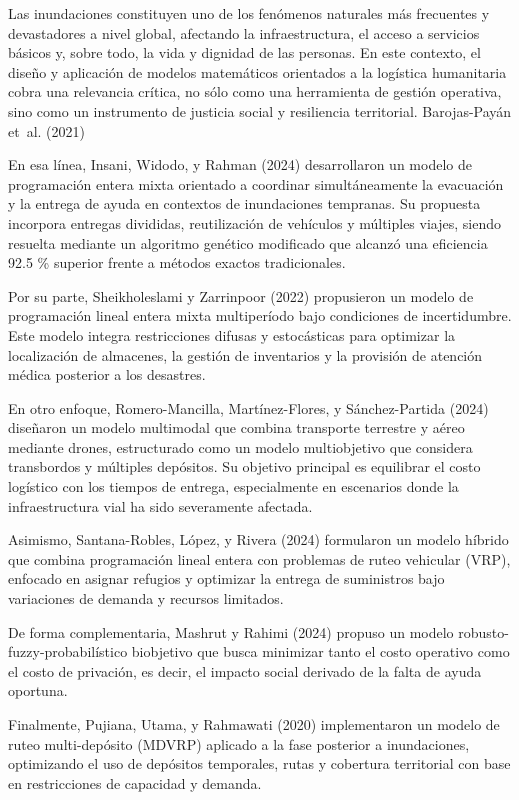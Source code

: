 \documentclass[
  spanish,
  us-letterpaper,
  DIV=11,
  numbers=noendperiod]{scrreprt}
\numberwithin{equation}{section}
\begin{document}
Las inundaciones constituyen uno de los fenómenos naturales más
frecuentes y devastadores a nivel global, afectando la infraestructura,
el acceso a servicios básicos y, sobre todo, la vida y dignidad de las
personas. En este contexto, el diseño y aplicación de modelos
matemáticos orientados a la logística humanitaria cobra una relevancia
crítica, no sólo como una herramienta de gestión operativa, sino como un
instrumento de justicia social y resiliencia territorial. Barojas-Payán
et~al. (2021)

En esa línea, Insani, Widodo, y Rahman (2024) desarrollaron un modelo de
programación entera mixta orientado a coordinar simultáneamente la
evacuación y la entrega de ayuda en contextos de inundaciones tempranas.
Su propuesta incorpora entregas divididas, reutilización de vehículos y
múltiples viajes, siendo resuelta mediante un algoritmo genético
modificado que alcanzó una eficiencia 92.5 \% superior frente a métodos
exactos tradicionales.

Por su parte, Sheikholeslami y Zarrinpoor (2022) propusieron un modelo
de programación lineal entera mixta multiperíodo bajo condiciones de
incertidumbre. Este modelo integra restricciones difusas y estocásticas
para optimizar la localización de almacenes, la gestión de inventarios y
la provisión de atención médica posterior a los desastres.

En otro enfoque, Romero-Mancilla, Martínez-Flores, y Sánchez-Partida
(2024) diseñaron un modelo multimodal que combina transporte terrestre y
aéreo mediante drones, estructurado como un modelo multiobjetivo que
considera transbordos y múltiples depósitos. Su objetivo principal es
equilibrar el costo logístico con los tiempos de entrega, especialmente
en escenarios donde la infraestructura vial ha sido severamente
afectada.

Asimismo, Santana-Robles, López, y Rivera (2024) formularon un modelo
híbrido que combina programación lineal entera con problemas de ruteo
vehicular (VRP), enfocado en asignar refugios y optimizar la entrega de
suministros bajo variaciones de demanda y recursos limitados.

De forma complementaria, Mashrut y Rahimi (2024) propuso un modelo
robusto-fuzzy-probabilístico biobjetivo que busca minimizar tanto el
costo operativo como el costo de privación, es decir, el impacto social
derivado de la falta de ayuda oportuna.

Finalmente, Pujiana, Utama, y Rahmawati (2020) implementaron un modelo
de ruteo multi-depósito (MDVRP) aplicado a la fase posterior a
inundaciones, optimizando el uso de depósitos temporales, rutas y
cobertura territorial con base en restricciones de capacidad y demanda.
\end{document}
